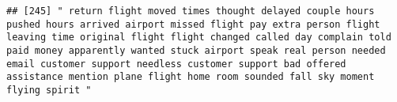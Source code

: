 \documentclass[
]{article}
\begin{document}
\begin{verbatim}
## [245] " return flight moved times thought delayed couple hours pushed hours arrived airport missed flight pay extra person flight leaving time original flight flight changed called day complain told paid money apparently wanted stuck airport speak real person needed email customer support needless customer support bad offered assistance mention plane flight home room sounded fall sky moment flying spirit "                                                                                                                                                                                                                                                                                                                                                                                                                                                                                                                                                                                                                                                                                                                                                                                                                                                                                                                                                                                                                                                                                                                                                                                                                                                                                                                                                                             

\end{verbatim}
\end{document}
